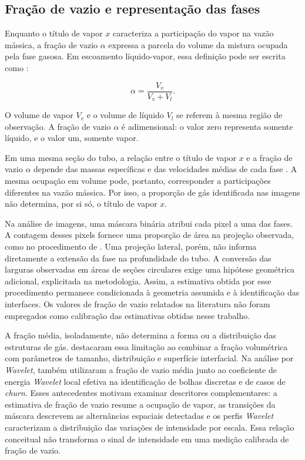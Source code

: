 \subsection{Fração de vazio e representação das fases}\label{sec:fracao-vazio}

Enquanto o título de vapor $x$ caracteriza a participação do vapor na vazão
mássica, a fração de vazio $\alpha$ expressa a parcela do volume da mistura ocupada
pela fase gasosa. Em escoamento líquido-vapor, essa definição pode ser escrita
como \cite{masiukiewicz2021}:

\begin{equation}\label{eq:fracao-vazio-volume}
  \alpha=\frac{V_v}{V_v+V_l}.
\end{equation}

\noindent
O volume de vapor $V_v$ e o volume de líquido $V_l$ se referem à mesma região
de observação. A fração de vazio $\alpha$ é adimensional: o valor zero
representa somente líquido, e o valor um, somente vapor.

Em uma mesma seção do tubo, a relação entre o título de vapor $x$ e a
fração de vazio $\alpha$ depende das massas específicas e das velocidades médias de cada fase
\cite{deoliveira2021}. A mesma ocupação em volume pode, portanto,
corresponder a participações diferentes na vazão mássica. Por isso, a
proporção de gás identificada nas imagens não determina, por si só,
o título de vapor $x$.

Na análise de imagens, uma máscara binária atribui cada pixel a uma das
fases. A contagem desses pixels fornece uma proporção de área na projeção
observada, como no procedimento de .
Uma projeção lateral, porém, não informa diretamente a extensão da fase
na profundidade do tubo. A conversão das larguras observadas em áreas de
seções circulares exige uma hipótese geométrica adicional, explicitada na
metodologia. Assim, a estimativa obtida por esse procedimento permanece
condicionada à geometria assumida e à identificação das interfaces.
Os valores de fração de vazio relatados na literatura não foram empregados
como calibração das estimativas obtidas nesse trabalho.

A fração média, isoladamente, não determina a forma ou a distribuição das
estruturas de gás.  destacaram essa limitação ao
combinar a fração volumétrica com parâmetros de tamanho, distribuição e
superfície interfacial. Na análise por \textit{Wavelet},
 também utilizaram a fração de vazio média junto ao
coeficiente de energia \textit{Wavelet} local efetiva na identificação de bolhas discretas
e de casos de \textit{churn}. Esses antecedentes motivam examinar
descritores complementares: a estimativa de fração de vazio resume a
ocupação de vapor, as transições da máscara descrevem as alternâncias
espaciais detectadas e os perfis \textit{Wavelet} caracterizam a distribuição
das variações de intensidade por escala. Essa relação conceitual não
transforma o sinal de intensidade em uma medição calibrada de fração de vazio.

